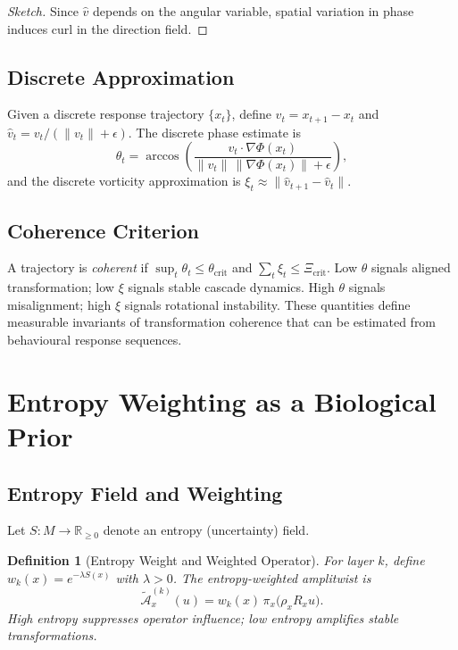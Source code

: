 \documentclass[12pt, a4paper]{article}
\newtheorem{definition}[theorem]{Definition}
\theoremstyle{remark}
\theoremstyle{definition}
\begin{document}
\begin{proof}[Sketch]
Since $\hat{v}$ depends on the angular variable, spatial variation in phase induces curl in
the direction field.
\end{proof}

\subsection{Discrete Approximation}

Given a discrete response trajectory $\{x_t\}$, define $v_t = x_{t+1} - x_t$ and
$\hat{v}_t = v_t/(\|v_t\|+\epsilon)$.  The discrete phase estimate is
\[
\theta_t = \arccos\!\left(
\frac{v_t \cdot \nabla\Phi(x_t)}{\|v_t\|\,\|\nabla\Phi(x_t)\|+\epsilon}
\right),
\]
and the discrete vorticity approximation is
$\xi_t \approx \|\hat{v}_{t+1} - \hat{v}_t\|$.

\subsection{Coherence Criterion}

A trajectory is \emph{coherent} if $\sup_t \theta_t \le \theta_{\mathrm{crit}}$ and
$\sum_t \xi_t \le \Xi_{\mathrm{crit}}$.  Low $\theta$ signals aligned transformation; low
$\xi$ signals stable cascade dynamics.  High $\theta$ signals misalignment; high $\xi$
signals rotational instability.  These quantities define measurable invariants of
transformation coherence that can be estimated from behavioural response sequences.

\section{Entropy Weighting as a Biological Prior}
\label{app:entropy}

\subsection{Entropy Field and Weighting}

Let $S \colon M \to \mathbb{R}_{\ge 0}$ denote an entropy (uncertainty) field.

\begin{definition}[Entropy Weight and Weighted Operator]
For layer $k$, define $w_k(x) = e^{-\lambda S(x)}$ with $\lambda > 0$.  The
entropy-weighted amplitwist is
\[
\widetilde{\mathcal{A}}^{(k)}_x(u)
= w_k(x)\,\pi_x\!\bigl(\rho_x R_x u\bigr).
\]
High entropy suppresses operator influence; low entropy amplifies stable transformations.
\end{definition}
\end{document}
